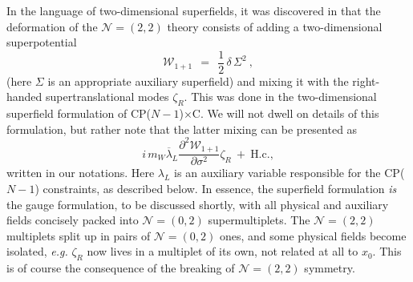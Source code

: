 \documentclass[12pt]{article}
\newcommand{\ntwot}{${\mathcal N}= \left(2,2\right) $ }
\newcommand{\ntwoo}{${\mathcal N}= \left(0,2\right) $ }
\newcommand{\p}{\partial}
\newcommand{\ov}{\overline}
\newcommand{\mc}[1]{\mathcal{#1}}
\newcommand{\CPCn}{CP($N-1$)$\times$C}
\begin{document}
	In the language of two-dimensional superfields, it was discovered in \cite{Edalati} that
the deformation of the \ntwot theory consists of adding a two-dimensional superpotential
\[
	\mathcal{W}_{1+1} ~~=~~ \frac{1}{2}\,\delta\,\Sigma^2~,
\]
(here $ \Sigma $ is an appropriate auxiliary superfield)
and mixing it with the right-handed supertranslational modes $ \zeta_R $. 
This was done in the two-dimensional superfield formulation of \CPCn.
	We will not dwell on details of this formulation, but rather note that the latter
mixing can be presented as
\[
	i\, m_W \ov{\lambda}_L \frac{\p^2 \mc{W}_{1+1}}{\p \sigma^2} \zeta_R  ~+~ \text{H.c.},
\]
	written in our notations. 
	Here $ \lambda_L $ is an auxiliary variable responsible for the CP($N-1$) constraints, as described below.
	In essence, the superfield formulation \emph{is} the gauge formulation, to be discussed
	shortly, with
	all physical and auxiliary fields concisely packed into \ntwoo supermultiplets.
	The \ntwot multiplets split up in pairs of \ntwoo ones, and some physical fields become
	isolated, {\it e.g.} $ \zeta_R $ now lives in a multiplet of its own, not related at all to $ x_0 $.
	This is of course the consequence of the breaking of \ntwot symmetry.
\end{document}
